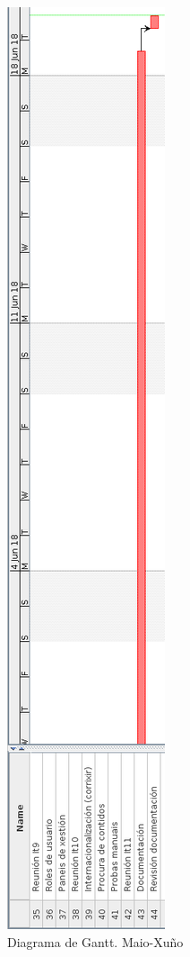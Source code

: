 \begin{figure}[H]
	\centering
	\includegraphics[scale=0.45,keepaspectratio=true]{./images/gantt/g11.png}
	\caption{Diagrama de Gantt. Maio-Xuño}
\end{figure}

